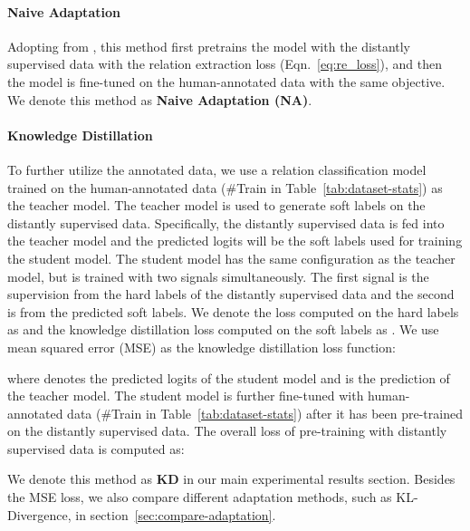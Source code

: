 \documentclass[11pt]{article}
\begin{document}
    \paragraph{Naive Adaptation} Adopting from \citep{xu2021entity}, this method first pretrains the model with the distantly supervised data with the relation extraction loss  (Eqn.~\ref{eq:re_loss}), and then the model is fine-tuned on the human-annotated data with the same objective. We denote this method as \textbf{Naive Adaptation (NA)}.
    
    \paragraph{Knowledge Distillation} To further utilize the annotated data, we use a relation classification model trained on the human-annotated data (\#Train in Table~\ref{tab:dataset-stats}) as the teacher model. The teacher model is used to generate soft labels on the distantly supervised data. Specifically, the distantly supervised data is fed into the teacher model and the predicted logits will be the soft labels used for training the student model. The student model has the same configuration as the teacher model, but is trained with two signals simultaneously. The first signal is the supervision from the hard labels of the distantly supervised data and the second is from the predicted soft labels. We denote the loss computed on the hard labels as  and the knowledge distillation loss computed on the soft labels as . We use mean squared error (MSE) as the knowledge distillation loss function:
    
    where  denotes the predicted logits of the student model and  is the prediction of the teacher model.
The student model is further fine-tuned with human-annotated data (\#Train in Table~\ref{tab:dataset-stats}) after it has been pre-trained on the distantly supervised data. 
    The overall loss of pre-training with distantly supervised data is computed as:
    
    We denote this method as \textbf{KD} in our main experimental results section. Besides the MSE loss, we also compare different adaptation methods, such as KL-Divergence, in section~\ref{sec:compare-adaptation}.



    
\end{document}
